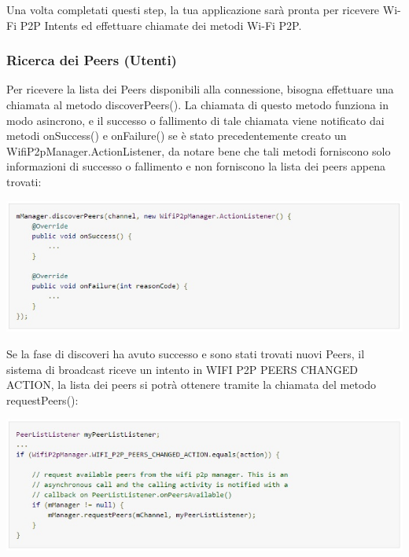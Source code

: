 Una volta completati questi step, la tua applicazione sarà pronta per ricevere Wi-Fi P2P Intents ed effettuare chiamate dei metodi Wi-Fi P2P.

\subsubsection{Ricerca dei Peers (Utenti)}

Per ricevere la lista dei Peers disponibili alla connessione, bisogna effettuare una chiamata al metodo discoverPeers().
La chiamata di questo metodo funziona in modo asincrono, e il successo o fallimento di tale chiamata viene notificato dai metodi onSuccess() e onFailure() se è stato precedentemente creato un WifiP2pManager.ActionListener, da notare bene che tali metodi forniscono solo informazioni di successo o fallimento e non forniscono la lista dei peers appena trovati:

\begin{center}
\includegraphics[width=1\textwidth]{imgs/discover_peers.jpg}
\label{discover_peers_img}%
\end{center}

Se la fase di discoveri ha avuto successo e sono stati trovati nuovi Peers, il sistema di broadcast riceve un intento in WIFI P2P PEERS CHANGED ACTION, la lista dei peers si potrà ottenere tramite la chiamata del metodo requestPeers():

\begin{center}
\includegraphics[width=1\textwidth]{imgs/intent_peers.jpg}
\label{intent_peers_img}%
\end{center}

